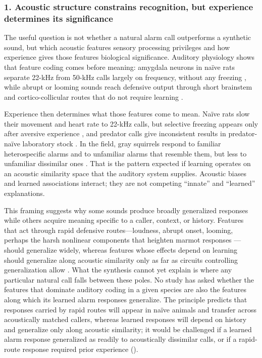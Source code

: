 \subsubsection*{1. Acoustic structure constrains recognition, but experience determines its significance}

The useful question is not whether a natural alarm call outperforms a synthetic sound, but which acoustic features sensory processing privileges and how experience gives those features biological significance. Auditory physiology shows that feature coding comes before meaning: amygdala neurons in naïve rats separate 22-kHz from 50-kHz calls largely on frequency, without any freezing \citep{ParsanaEtAl2012a}, while abrupt or looming sounds reach defensive output through short brainstem and cortico-collicular routes that do not require learning \citep{DavisEtAl1982,XiongEtAl2015,LiEtAl2021}.

Experience then determines what those features come to mean. Naïve rats slow their movement and heart rate to 22-kHz calls, but selective freezing appears only after aversive experience \citep{OlszynskiEtAl2020,KimEtAl2010}, and predator calls give inconsistent results in predator-naïve laboratory stock \citep{HendrieNeill1991,KindermannEtAl2009}. In the field, gray squirrels respond to familiar heterospecific alarms and to unfamiliar alarms that resemble them, but less to unfamiliar dissimilar ones \citep{GetschowEtAl2013}. That is the pattern expected if learning operates on an acoustic similarity space that the auditory system supplies. Acoustic biases and learned associations interact; they are not competing ``innate'' and ``learned'' explanations.

This framing suggests why some sounds produce broadly generalized responses while others acquire meaning specific to a caller, context, or history. Features that act through rapid defensive routes---loudness, abrupt onset, looming, perhaps the harsh nonlinear components that heighten marmot responses \citep{BlumsteinRecapet2009}---should generalize widely, whereas features whose effects depend on learning should generalize along acoustic similarity only as far as circuits controlling generalization allow \citep{ConcinaEtAl2018,QuinnEtAl2009}. What the synthesis cannot yet explain is where any particular natural call falls between these poles. No study has asked whether the features that dominate auditory coding in a given species are also the features along which its learned alarm responses generalize. The principle predicts that responses carried by rapid routes will appear in naïve animals and transfer across acoustically matched callers, whereas learned responses will depend on history and generalize only along acoustic similarity; it would be challenged if a learned alarm response generalized as readily to acoustically dissimilar calls, or if a rapid-route response required prior experience ().

